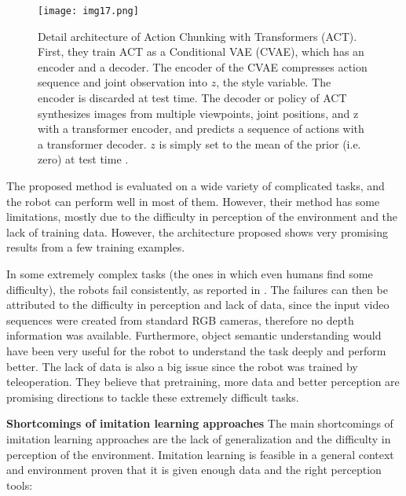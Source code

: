 \begin{figure}[ht]
	\centering
	\texttt{[image: img17.png]}
	\captionsetup{width=1\linewidth}
	\caption{Detail architecture of Action Chunking with Transformers (ACT).
		First, they train ACT as a Conditional VAE (CVAE), which has an encoder and a decoder.
		The encoder of the CVAE compresses action sequence and joint observation into $z$, the style variable.
		The encoder is discarded at test time. The decoder or policy of ACT synthesizes images from
		multiple viewpoints, joint positions, and z with a transformer encoder, and
		predicts a sequence of actions with a transformer decoder. $z$ is simply set to the mean of the prior
		(i.e. zero) at test time \cite{tony2023bimanual}.}
	\label{fig:img17}
\end{figure}

The proposed method is evaluated on a wide variety of complicated tasks, and the robot can
perform well in most of them. However, their method has some limitations, mostly due to the
difficulty in perception of the environment and the lack of training data. However, the architecture
proposed shows very promising results from a few training examples.

In some extremely complex tasks (the ones in which even humans find some difficulty),
the robots fail consistently, as reported in \cite{tony2023bimanual}. The failures can then be
attributed to the difficulty in perception and lack of data, since the input video sequences were
created from standard RGB cameras, therefore no depth information was available. Furthermore,
object semantic understanding would have been very useful for the robot to understand the task
deeply and perform better. The lack of data is also a big issue since the robot was trained
by teleoperation. They believe that pretraining, more data and better perception are promising
directions to tackle these extremely difficult tasks.


\textbf{Shortcomings of imitation learning approaches} \quad
The main shortcomings of imitation learning approaches are the lack of generalization and
the difficulty in perception of the environment. Imitation learning is feasible in a general
context and environment proven that it is given enough data and the right perception tools:

